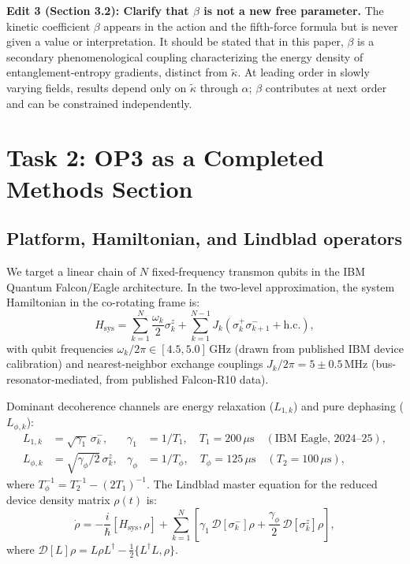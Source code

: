 \documentclass[12pt,letterpaper]{article}
\theoremstyle{plain}
\theoremstyle{definition}
\newcommand{\kt}{\tilde{\kappa}}
\newcommand{\DD}{\mathcal{D}}
\begin{document}
\textbf{Edit 3 (Section 3.2): Clarify that $\beta$ is not a new free parameter.}
The kinetic coefficient $\beta$ appears in the action and the fifth-force formula but is never given a value or interpretation.  It should be stated that in this paper, $\beta$ is a secondary phenomenological coupling characterizing the energy density of entanglement-entropy gradients, distinct from $\kt$.  At leading order in slowly varying fields, results depend only on $\kt$ through $\alpha$; $\beta$ contributes at next order and can be constrained independently.

\section{Task 2: OP3 as a Completed Methods Section}
\label{sec:methods}

\subsection{Platform, Hamiltonian, and Lindblad operators}

We target a linear chain of $N$ fixed-frequency transmon qubits in the IBM Quantum Falcon/Eagle architecture.  In the two-level approximation, the system Hamiltonian in the co-rotating frame is:
\begin{equation}
  H_{\mathrm{sys}}
  = \sum_{k=1}^{N}\frac{\omega_k}{2}\sigma^z_k
  + \sum_{k=1}^{N-1}J_k\!\left(\sigma^+_k\sigma^-_{k+1}
    + \mathrm{h.c.}\right),
  \label{eq:H-transmon}
\end{equation}
with qubit frequencies $\omega_k/2\pi \in [4.5,5.0]$\,GHz (drawn from published IBM device calibration) and nearest-neighbor exchange couplings $J_k/2\pi = 5 \pm 0.5$\,MHz (bus-resonator-mediated, from published Falcon-R10 data).

Dominant decoherence channels are energy relaxation ($L_{1,k}$) and pure dephasing ($L_{\phi,k}$):
\begin{align}
  L_{1,k} &= \sqrt{\gamma_1}\,\sigma^-_k,
  & \gamma_1 &= 1/T_1,
  \quad T_1 = 200\,\mu\text{s} \quad (\text{IBM Eagle, 2024--25}),
  \label{eq:L1} \\
  L_{\phi,k} &= \sqrt{\gamma_\phi/2}\,\sigma^z_k,
  & \gamma_\phi &= 1/T_\phi,
  \quad T_\phi = 125\,\mu\text{s} \quad (T_2 = 100\,\mu\text{s}),
  \label{eq:Lphi}
\end{align}
where $T_\phi^{-1} = T_2^{-1} - (2T_1)^{-1}$.  The Lindblad master equation for the reduced device density matrix $\rho(t)$ is:
\begin{equation}
  \dot{\rho}
  = -\frac{i}{\hbar}[H_{\mathrm{sys}},\rho]
  + \sum_{k=1}^{N}\!\left[
    \gamma_1\,\DD[\sigma^-_k]\rho
    + \frac{\gamma_\phi}{2}\,\DD[\sigma^z_k]\rho
  \right],
  \label{eq:lindblad}
\end{equation}
where $\DD[L]\rho = L\rho L^\dagger - \tfrac{1}{2}\{L^\dagger L,\rho\}$.
\end{document}
